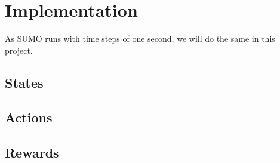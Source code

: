 \section{Implementation}

As SUMO runs with time steps of one second, we will do the same in this project. 

\subsection{States}

\subsection{Actions}



\subsection{Rewards}

